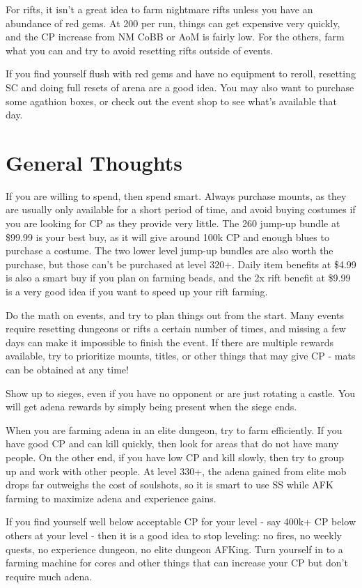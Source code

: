 \documentclass[]{article}
\begin{document}
For rifts, it isn't a great idea to farm nightmare rifts unless you have an abundance of red gems.
At 200 per run, things can get expensive very quickly, and the CP increase from NM CoBB or AoM is fairly low.
For the others, farm what you can and try to avoid resetting rifts outside of events.

If you find yourself flush with red gems and have no equipment to reroll, resetting SC and doing full resets of arena are a good idea.
You may also want to purchase some agathion boxes, or check out the event shop to see what's available that day.

\pagebreak
\section{General Thoughts}

If you are willing to spend, then spend smart.
Always purchase mounts, as they are usually only available for a short period of time, and avoid buying costumes if you are looking for CP as they provide very little.
The 260 jump-up bundle at \$99.99 is your best buy, as it will give around 100k CP and enough blues to purchase a costume.
The two lower level jump-up bundles are also worth the purchase, but those can't be purchased at level 320+.
Daily item benefits at \$4.99 is also a smart buy if you plan on farming beads, and the 2x rift benefit at \$9.99 is a very good idea if you want to speed up your rift farming.

Do the math on events, and try to plan things out from the start.
Many events require resetting dungeons or rifts a certain number of times, and missing a few days can make it impossible to finish the event.
If there are multiple rewards available, try to prioritize mounts, titles, or other things that may give CP - mats can be obtained at any time!

Show up to sieges, even if you have no opponent or are just rotating a castle.
You will get adena rewards by simply being present when the siege ends.

When you are farming adena in an elite dungeon, try to farm efficiently.
If you have good CP and can kill quickly, then look for areas that do not have many people.
On the other end, if you have low CP and kill slowly, then try to group up and work with other people.
At level 330+, the adena gained from elite mob drops far outweighs the cost of soulshots, so it is smart to use SS while AFK farming to maximize adena and experience gains.

If you find yourself well below acceptable CP for your level - say 400k+ CP below others at your level - then it is a good idea to stop leveling: no fires, no weekly quests, no experience dungeon, no elite dungeon AFKing.
Turn yourself in to a farming machine for cores and other things that can increase your CP but don't require much adena.
\end{document}
